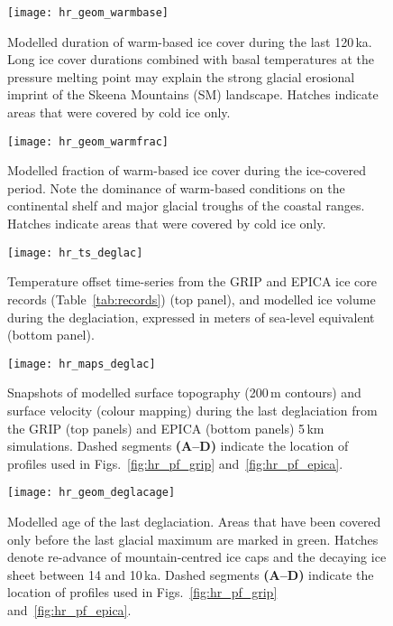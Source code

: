 \documentclass[tc, manuscript]{copernicus}
\begin{document}
\begin{figure*}%
\texttt{[image: hr\_geom\_warmbase]}
\caption{%
      Modelled duration of warm-based ice cover during the last
      120\,\unit{ka}. Long ice cover durations combined with basal
      temperatures at the pressure melting point may explain the strong
      glacial erosional imprint of the Skeena Mountains (SM) landscape.
      Hatches indicate areas that were covered by cold ice only.}
\label{fig:hr_geom_warmbase}%
\end{figure*}%


\begin{figure*}%
\texttt{[image: hr\_geom\_warmfrac]}
\caption{%
      Modelled fraction of warm-based ice cover during the ice-covered
      period. Note the dominance of warm-based conditions on the continental
      shelf and major glacial troughs of the coastal ranges. Hatches
      indicate areas that were covered by cold ice only.}
\label{fig:hr_geom_warmfrac}%
\end{figure*}%


\begin{figure}%
\texttt{[image: hr\_ts\_deglac]}
\caption{%
      Temperature offset time-series from the GRIP and EPICA ice core
      records (Table~\ref{tab:records}) (top panel), and modelled ice volume
      during the deglaciation, expressed in meters of sea-level equivalent
      (bottom panel).}
\label{fig:hr_ts_deglac}%
\end{figure}%


\begin{figure*}%
\texttt{[image: hr\_maps\_deglac]}
\caption{%
      Snapshots of modelled surface topography (200\,\unit{m} contours) and
      surface velocity (colour mapping) during the last deglaciation from
      the GRIP (top panels) and EPICA (bottom panels) 5\,\unit{km}
      simulations. Dashed segments \textbf{(A--D)} indicate the location of
      profiles used in Figs.~\ref{fig:hr_pf_grip}
      and~\ref{fig:hr_pf_epica}.}
\label{fig:hr_maps_deglac}%
\end{figure*}%


\begin{figure*}%
\texttt{[image: hr\_geom\_deglacage]}
\caption{%
      Modelled age of the last deglaciation. Areas that have been covered
      only before the last glacial maximum are marked in green. Hatches
      denote re-advance of mountain-centred ice caps and the decaying ice
      sheet between 14 and 10\,\unit{ka}. Dashed segments \textbf{(A--D)}
      indicate the location of profiles used in Figs.~\ref{fig:hr_pf_grip}
      and~\ref{fig:hr_pf_epica}.}
\label{fig:hr_geom_deglacage}%
\end{figure*}%
\end{document}
